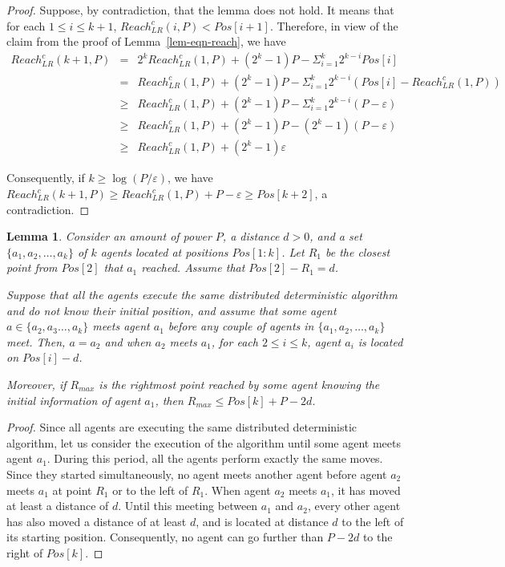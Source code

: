 \documentclass{article}
\newtheorem{lemma}{Lemma}
\newcommand\rclr{Reach_{LR}^c\xspace}
\begin{document}
\begin{proof}
Suppose, by contradiction, that the lemma does not hold. It means that
for each $1 \leq i \leq k+1$, $\rclr(i,P) <
Pos[i+1]$. Therefore, in view of the claim from the proof of Lemma~\ref{lem-eqn-reach}, we have
\begin{eqnarray*}
\rclr(k+1,P) &=& 2^{k}\rclr(1,P)+(2^{k}-1)P - \Sigma_{i=1}^{k}
2^{k-i}Pos[i]\\
&=& \rclr(1,P) +(2^{k}-1)P - \Sigma_{i=1}^{k}
2^{k-i}(Pos[i]-\rclr(1,P))\\
&\geq& \rclr(1,P) +(2^{k}-1)P - \Sigma_{i=1}^{k}
2^{k-i}(P-\varepsilon)\\
&\geq& \rclr(1,P) +(2^{k}-1)P - (2^{k}-1)(P-\varepsilon)\\
& \geq& \rclr(1,P) +(2^{k}-1)\varepsilon
\end{eqnarray*}

Consequently, if $k \geq  \log(P/\varepsilon)$, we have 
$\rclr(k+1,P) \geq \rclr(1,P) + P - \varepsilon \geq Pos[k+2]$, 
a contradiction.
\end{proof}

\begin{lemma}\label{lem-online-gap}
Consider an amount of power $P$, a distance $d > 0$, and a set
$\{a_1,a_2, \ldots, a_k\}$ of $k$ agents located at positions
$Pos[1:k]$.  Let $R_1$ be the closest point from $Pos[2]$ that $a_1$
reached. Assume that $Pos[2]-R_1 = d$.

Suppose that all the agents execute the same distributed deterministic algorithm
and do not know their initial position, and assume that some agent $a
\in \{ a_2, a_3\ldots, a_k\}$ meets agent $a_1$ before any couple of agents 
in $\{a_1, a_2, \ldots, a_k\}$ meet. Then, $a = a_2$
and when $a_2$ meets $a_1$, for each $2 \leq i \leq k$, agent $a_i$ is
located on $Pos[i]-d$.

Moreover, if $R_{max}$ is the rightmost point reached by
some agent knowing the initial information of agent $a_1$, then
$R_{max} \leq   Pos[k] + P - 2d$.
\end{lemma}


\begin{proof}
Since all agents are executing the same distributed deterministic algorithm, let
us consider the execution of the algorithm until some agent meets
agent $a_1$. During this period, all the agents perform exactly the
same moves. Since they started simultaneously, no agent meets another agent before agent $a_2$
meets $a_1$ at point $R_1$ or to the left of $R_1$. When agent $a_2$
meets $a_1$, it has moved at least a distance of $d$. Until this
meeting between $a_1$ and $a_2$, every other agent has also moved a
distance of at least $d$, and is located at distance $d$ to the left
of its starting position. Consequently, no agent can go further than
$P-2d$ to the right of $Pos[k]$.
\end{proof}
\end{document}
